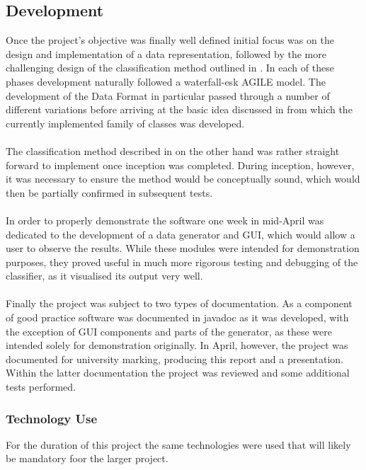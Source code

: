 \documentclass[main.tex]{subfiles}
\begin{document}
    \subsection{Development}
    
      Once the project's objective was finally well defined initial focus was on the design and implementation of a data representation, followed by the more challenging design of the classification method outlined in . In each of these phases development naturally followed a waterfall-esk AGILE model. The development of the Data Format in particular passed through a number of different variations before arriving at the basic idea discussed in  from which the currently implemented family of classes was developed.
      \\\\
      The classification method described in  on the other hand was rather straight forward to implement once inception was completed. During inception, however, it was necessary to ensure the method would be conceptually sound, which would then be partially confirmed in subsequent tests.
      \\\\
      In order to properly demonstrate the software one week in mid-April was dedicated to the development of a data generator and GUI, which would allow a user to observe the results. While these modules were intended for demonstration purposes, they proved useful in much more rigorous testing and debugging of the classifier, as it visualised its output very well.
      \\\\
      Finally the project was subject to two types of documentation. As a component of good practice software was documented in javadoc as it was developed, with the exception of GUI components and parts of the generator, as these were intended solely for demonstration originally. In April, however, the project was documented for university marking, producing this report and a presentation. Within the latter documentation the project was reviewed and some additional tests performed.
      
      \subsubsection*{Technology Use}
        
        For the duration of this project the same technologies were used that will likely be mandatory foor the larger project.
        
\end{document}
